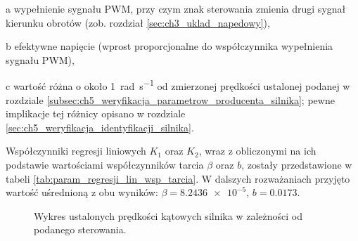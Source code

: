 \begin{table}[H]
\begin{threeparttable}
        \begin{tablenotes}
            \footnotesize
            \item[a] wypełnienie sygnału PWM, przy czym znak sterowania zmienia drugi sygnał kierunku obrotów (zob. rozdział \ref{sec:ch3_uklad_napedowy}),
            \item[b] efektywne napięcie (wprost proporcjonalne do współczynnika wypełnienia sygnału PWM),
            \item[c] wartość różna o około \SI{1}{\radian\per\second} od zmierzonej prędkości ustalonej podanej w rozdziale \ref{subsec:ch5_weryfikacja_parametrow_producenta_silnika}; pewne implikacje tej różnicy opisano w rozdziale \ref{sec:ch5_weryfikacja_identyfikacji_silnika}.
        \end{tablenotes}
    \end{threeparttable}
\end{table}

Współczynniki regresji liniowych $K_1$ oraz $K_2$, wraz z obliczonymi na ich podstawie wartościami współczynników tarcia $\beta$ oraz $b$, zostały przedstawione w tabeli \ref{tab:param_regresji_lin_wsp_tarcia}. W dalszych rozważaniach przyjęto wartość uśrednioną z obu wyników: $\beta = \num{8,2436e-5}$, $b = \num{0,0173}$.

\begin{figure}[p]
    \centering
    
    \caption{Wykres ustalonych prędkości kątowych silnika w zależności od podanego sterowania.}
    \label{fig:predkosci_obrotowe_silnika}
\end{figure}

